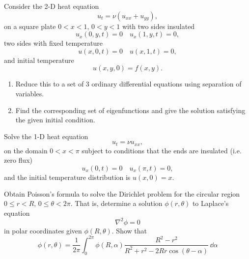 {\begin{Exercise}
\end{Exercise}







\begin{Exercise}
  \label{exercise head 2D insulated fixed initial}
  Consider the 2-D heat equation
  \[ 
  u_t = \nu (u_{x x}+u_{y y}),
  \]
  on a square plate $0 < x < 1$, $0 < y < 1$ with two sides insulated
  \[ 
  u_x(0,y,t) = 0 \quad u_x(1,y,t) = 0,
  \]
  two sides with fixed temperature
  \[ 
  u(x,0,t) = 0 \quad u(x,1,t) = 0,
  \]
  and initial temperature
  \[ 
  u(x,y,0) = f(x,y).
  \]

  \begin{enumerate}
  \item 
    Reduce this to a set of 3 ordinary differential equations using 
    separation of variables. 
  \item 
    Find the corresponding set of eigenfunctions and 
    give the solution satisfying the given initial condition. 
  \end{enumerate}

\end{Exercise}








\begin{Exercise}
  \label{exercise ut=nuuxx ux=ux=0}
  Solve the 1-D heat equation
  \[ 
  u_t = \nu u_{x x},
  \]
  on the domain $0 < x < \pi$ subject to conditions that the ends
  are insulated (i.e. zero flux)
  \[ 
  u_x(0,t) = 0 \quad u_x(\pi,t) = 0,
  \]
  and the initial temperature distribution is $u(x,0) = x$.

\end{Exercise}



\begin{Exercise}
  \label{exercise Poisson formula for a disk}
  Obtain Poisson's formula
  to solve the Dirichlet problem for the circular region $0 \leq r < R$,
  $0 \leq \theta < 2\pi$. That is, determine a solution 
  $\phi(r,\theta)$ to Laplace's  equation
  \[
  \nabla^2 \phi  = 0
  \]
  in polar coordinates given $\phi(R,\theta)$. Show that
  \[
  \phi(r,\theta) = \frac{1}{2 \pi} \int_0^{2 \pi} \phi(R,\alpha) 
  \frac{ R^2 - r^2 }{ R^2 + r^2 - 2 R r \cos(\theta - \alpha) } 
  \,\dd \alpha
  \]


\end{Exercise}}
